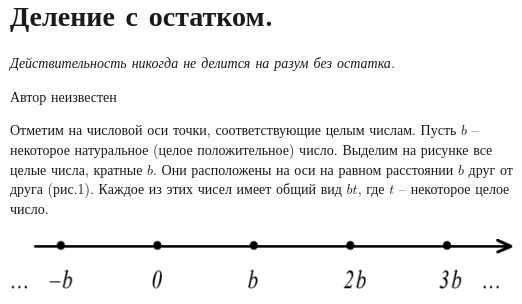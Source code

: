 
\section{Деление с остатком.}

\epigraph{
\textit{Действительность никогда не делится на разум без остатка.
}}{Автор неизвестен}

Отметим на числовой оси точки, соответствующие целым числам. Пусть $b$ – некоторое натуральное (целое положительное) число. Выделим на рисунке все целые числа, кратные $b$. Они расположены на оси на равном расстоянии $b$ друг от друга (рис.1). Каждое из этих чисел имеет общий вид $bt$, где $t$ – некоторое целое число. 

\begin{floatingfigure}[l]{0.3\textwidth}
	\includegraphics[scale=0.1]{./img/axis1}
\end{floatingfigure}